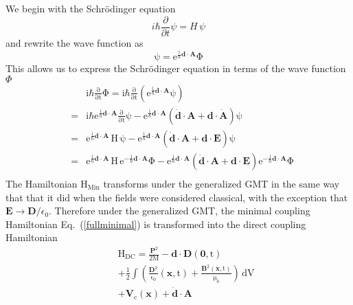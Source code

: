 \documentclass[twocolumn,english,pra,aps,superscriptaddress,floatfix]{revtex4-1}
\begin{document}
We begin with the Schr\"{o}dinger equation
\begin{equation}
i\hbar\frac{\partial}{\partial t}\psi=H\,\psi
\end{equation}
and rewrite the wave function as
\begin{equation}
\mathrm{\psi=e^{\frac{i}{\hbar}\mathbf{d}\cdot\mathbf{A}}\Phi}
\end{equation}
This allows us to express the Schr\"{o}dinger equation in terms of the wave function $\Phi$ 
\begin{eqnarray}
&&\mathrm{i\hbar\frac{\partial}{\partial t}\Phi=i\hbar\frac{\partial}{\partial t}\left(e^{\frac{i}{\hbar}\mathbf{d}\cdot\mathbf{A}}\psi\right)}\nonumber \\
&=&\mathrm{i\hbar e^{\frac{i}{\hbar}\mathbf{d}\cdot\mathbf{A}}\frac{\partial}{\partial t}\psi-e^{\frac{i}{\hbar}\mathbf{d}\cdot\mathbf{A}}\left(\dot{\mathbf{d}}\cdot\mathbf{A}+\mathbf{d}\cdot\dot{\mathbf{A}}\right)\psi} \nonumber \\
&=&\mathrm{e^{\frac{i}{\hbar}\mathbf{d}\cdot\mathbf{A}}\,H\,\psi-e^{\frac{i}{\hbar}\mathbf{d}\cdot\mathbf{A}}\left(\dot{\mathbf{d}}\cdot\mathbf{A}+\mathbf{d}\cdot\mathbf{E}\right)\psi} \nonumber \\
&=&\mathrm{e^{\frac{i}{\hbar}\mathbf{d}\cdot\mathbf{A}}\,H\,e^{-\frac{i}{\hbar}\mathbf{d}\cdot\mathbf{A}}\Phi-e^{\frac{i}{\hbar}\mathbf{d}\cdot\mathbf{A}}\left(\dot{\mathbf{d}}\cdot\mathbf{A}+\mathbf{d}\cdot\mathbf{E}\right)e^{-\frac{i}{\hbar}\mathbf{d}\cdot\mathbf{A}}\Phi} \nonumber \\
\end{eqnarray}
The Hamiltonian $\mathrm{H_{Min}}$ transforms under the generalized GMT in the same way that that it did when the fields were considered classical, with the exception that $\mathbf{E}\rightarrow\mathbf{D}/\epsilon_0$.  Therefore under the generalized GMT, the minimal coupling Hamiltonian Eq.\ (\ref{fullminimal}) is transformed into the direct coupling Hamiltonian
\begin{eqnarray}
&&\mathrm{H_{DC}=\frac{\mathbf{P}^2}{2M}-\mathbf{d}\cdot\mathbf{D}(\mathbf{0},t)}\nonumber \\
&&\mathrm{+\frac{1}{2}\int\left( \frac{\mathbf{D}^2}{\epsilon_0}(\mathbf{x},t)+\frac{\mathbf{B}^2(\mathbf{x},t)}{\mu_0}\right)\,dV} \nonumber \\
&&\mathrm{+\mathbf{V}_c(\mathbf{x})+\dot{\mathbf{d}}\cdot\mathbf{A}}
\end{eqnarray}

\end{document}
